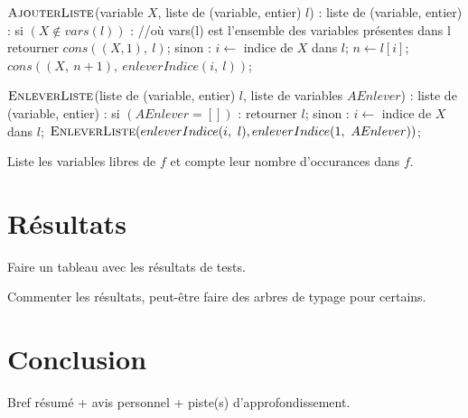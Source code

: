 \documentclass{rapport}
\theoremstyle{plain}
\theoremstyle{remark}
\theoremstyle{definition}
\begin{document}
\begin{algorithm}
\begin{PseudoCode}
$\textsc{AjouterListe}$(variable $X$, liste de (variable, entier) $l$) :
	liste de (variable, entier) :
si $(X \notin vars(l))$ :			//où vars(l) est l'ensemble des variables présentes dans l
    retourner $cons((X, 1),\ l)$;
sinon :
    $i \leftarrow$ indice de $X$ dans $l$;
    $n \leftarrow l[i]$;
    $cons((X,\ n + 1),\ enleverIndice(i,\ l))$;
    
$\textsc{EnleverListe}$(liste de (variable, entier) $l$, liste de variables $AEnlever$) :
	liste de (variable, entier) :
si $(AEnlever = [])$ :
    retourner $l$;
sinon :
    $i \leftarrow$ indice de $X$ dans $l$;
    $\textsc{EnleverListe}(enleverIndice(i,\ l), enleverIndice(1,\ AEnlever))$;
  \end{PseudoCode}
  \caption{Liste les variables libres de $f$ et compte leur nombre d'occurances dans $f$.}
\label{algo:varLibres}
\end{algorithm}

\section{Résultats}

Faire un tableau avec les résultats de tests.

Commenter les résultats, peut-être faire des arbres de typage pour certains.

\section{Conclusion}

Bref résumé + avis personnel + piste(s) d'approfondissement.



\end{document}
